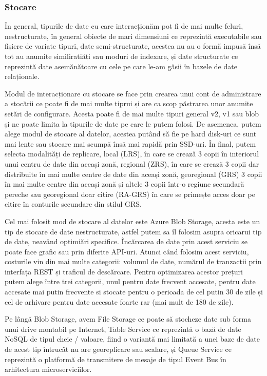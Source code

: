 \subsubsection{Stocare}

În general, tipurile de date cu care interacționăm pot fi de mai multe feluri,
nestructurate, în general obiecte de mari dimensiuni ce reprezintă executabile sau
fișiere de variate tipuri, date semi-structurate, acestea nu au o formă impusă însă
tot au anumite similiratiăți sau moduri de indexare, și date structurate ce reprezintă
date asemănătoare cu cele pe care le-am găsii în bazele de date relaționale.

Modul de interacționare cu stocare se face prin crearea unui cont de administrare
a stocării ce poate fi de mai multe tiprui și are ca scop păstrarea unor anumite setări
de configurare. Acesta poate fi de mai multe tipuri general v2, v1 sau blob
și ne poate limita la tipurile de date pe care le putem folosi. De asemenea,
putem alege modul de stocare al datelor, acestea putând să fie pe hard disk-uri
ce sunt mai lente sau stocare mai scumpă însă mai rapidă prin SSD-uri. În final,
putem selecta modalități de replicare, local (LRS), în care se crează 3 copii în
interiorul unui centru de date din aceași zonă, regional (ZRS), în care se crează
3 copii dar distribuite în mai multe centre de date din aceași zonă, georegional (GRS)
3 copii în mai multe centre din aceași zonă și altele 3 copii într-o regiune secundară pereche
sau georegional doar citire (RA-GRS) în care se primește acces doar pe citire în conturile secundare
din stilul GRS.

Cel mai folosit mod de stocare al datelor este Azure Blob Storage, acesta este un tip
de stocare de date nestructurate, astfel putem sa îl folosim asupra oricarui tip de date,
neavând optimiări specifice. Încărcarea de date prin acest serviciu se poate face grafic
sau prin diferite API-uri. Atunci când folosim acest serviciu, costurile vin din
mai multe categorii: volumul de date, numărul de tranzacții prin interfața REST și
traficul de descărcare. Pentru optimizarea acestor prețuri putem alege între trei categorii,
unul pentru date frecvent accesate, pentru date accesate mai putin frecvente si stocate pentru o perioada
de cel putin 30 de zile și cel de arhivare pentru date accesate foarte rar (mai mult de 180 de zile).

Pe lângă Blob Storage, avem File Storage ce poate să stocheze date sub forma unui drive montabil pe Internet,
Table Service ce reprezintă o bază de date NoSQL de tipul cheie / valoare, fiind o variantă
mai limitată a unei baze de date de acest tip întrucât nu are georeplicare sau scalare, și Queue Service
ce reprezintă o platformă de transmitere de mesaje de tipul Event Bus în arhitectura
microserviciilor.

